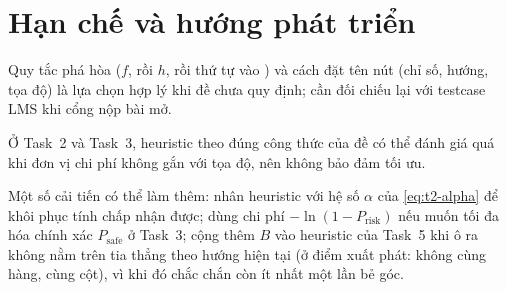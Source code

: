 \section{Hạn chế và hướng phát triển}
\label{sec:kl-han-che}

\begin{dssai}
  \item Quy tắc phá hòa ($f$, rồi $h$, rồi thứ tự vào \OPEN) và cách đặt tên nút (chỉ số, hướng,
        tọa độ) là lựa chọn hợp lý khi đề chưa quy định; cần đối chiếu lại với testcase LMS khi
        cổng nộp bài mở.
  \item Ở Task~2 và Task~3, heuristic theo đúng công thức của đề có thể đánh giá quá khi đơn vị chi
        phí không gắn với tọa độ, nên không bảo đảm tối ưu.
\end{dssai}

Một số cải tiến có thể làm thêm: nhân heuristic với hệ số $\alpha$ của \eqref{eq:t2-alpha} để
khôi phục tính chấp nhận được; dùng chi phí $-\ln(1 - P_{\text{risk}})$ nếu muốn tối đa hóa chính
xác $P_{\text{safe}}$ ở Task~3; cộng thêm $B$ vào heuristic của Task~5 khi ô ra không nằm trên tia thẳng
theo hướng hiện tại (ở điểm xuất phát: không cùng hàng, cùng cột), vì khi đó chắc chắn còn ít nhất
một lần bẻ góc.
